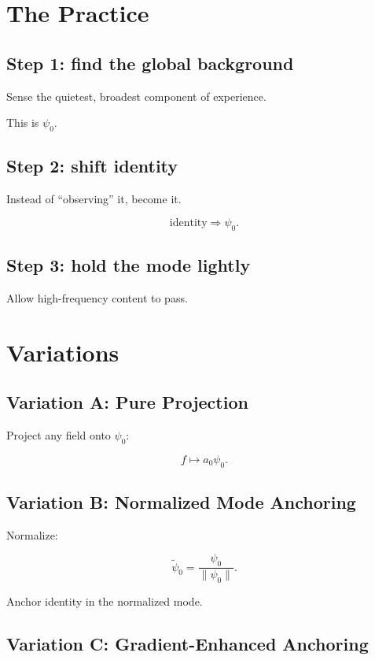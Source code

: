 \documentclass[12pt]{article}
\begin{document}
\section{The Practice}

\subsection*{Step 1: find the global background}

Sense the quietest, broadest component of experience.

This is $\psi_0$.

\subsection*{Step 2: shift identity}

Instead of ``observing'' it, become it.

\[
\text{identity} \Rightarrow \psi_0.
\]

\subsection*{Step 3: hold the mode lightly}

Allow high-frequency content to pass.

\section{Variations}

\subsection{Variation A: Pure Projection}

Project any field onto $\psi_0$:

\[
f \mapsto a_0\psi_0.
\]

\subsection{Variation B: Normalized Mode Anchoring}

Normalize:

\[
\tilde{\psi}_0 = \frac{\psi_0}{\|\psi_0\|}.
\]

Anchor identity in the normalized mode.

\subsection{Variation C: Gradient-Enhanced Anchoring}
\end{document}
